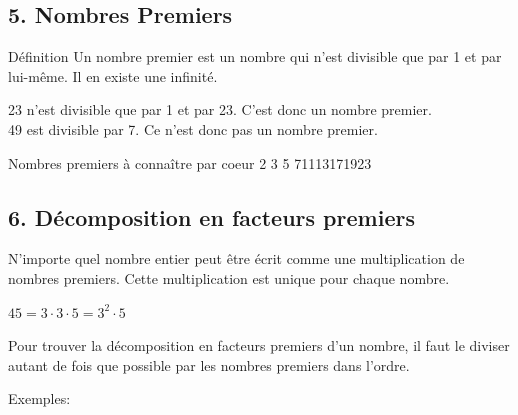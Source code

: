 \newpage
\subsection*{5. Nombres Premiers}

\begin{regle}{Définition}
Un nombre premier est un nombre qui n'est divisible que par 1 et par lui-même. Il en existe une infinité.
\end{regle}

\begin{center}
23 n'est divisible que par 1 et par 23. C'est donc un nombre premier.\\
49 est divisible par 7. Ce n'est donc pas un nombre premier.
\end{center}

\vspace{20pt}\begin{astuce}{Nombres premiers à connaître par coeur}
\hfill 2 \hfill 3 \hfill 5	 \hfill 7\hfill 11\hfill 13\hfill 17\hfill 19\hfill 23
\end{astuce}

\vfill
\subsection*{6. Décomposition en facteurs premiers}

N'importe quel nombre entier peut être écrit comme une multiplication de nombres premiers. Cette multiplication est unique pour chaque nombre.

\begin{center}
$45=3\cdot 3\cdot 5=3^2\cdot 5$\\
\end{center}

Pour trouver la décomposition en facteurs premiers d'un nombre, il faut le diviser autant de fois que possible par les nombres premiers dans l'ordre.

\vspace{30pt}
Exemples: 

